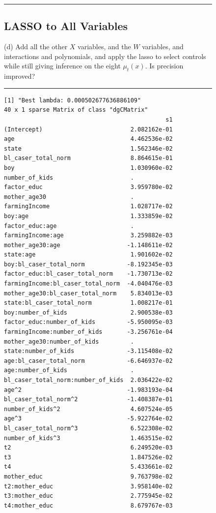 \documentclass{article}
\newenvironment{colorparagraph}[1]{\par\color{#1}}{\par}
\begin{document}
\begin{figure}[H]
\begin{colorparagraph}{questioncolor}
\label{q3d}
\rule{\textwidth}{0.5pt}
\subsection{LASSO to All Variables}
(d) Add all the other \( X \) variables, and the \( W \) variables, and interactions and polynomials, and apply the lasso to select controls while still giving inference on the eight \( \mu_t(x) \). Is precision improved?

\rule{\textwidth}{0.5pt}
\end{colorparagraph}
\end{figure}

\begin{figure}[H]
\begin{lstlisting}[style=RstyleComment, caption=LASSO for CATE]
[1] "Best lambda: 0.000502677636886109"
40 x 1 sparse Matrix of class "dgCMatrix"
                                              s1
(Intercept)                         2.082162e-01
age                                 4.462536e-02
state                               1.562346e-02
bl_caser_total_norm                 8.864615e-01
boy                                 1.030960e-02
number_of_kids                      .           
factor_educ                         3.959780e-02
mother_age30                        .           
farmingIncome                       1.028717e-02
boy:age                             1.333859e-02
factor_educ:age                     .           
farmingIncome:age                   3.259882e-03
mother_age30:age                   -1.148611e-02
state:age                           1.901602e-02
boy:bl_caser_total_norm            -8.192345e-03
factor_educ:bl_caser_total_norm    -1.730713e-02
farmingIncome:bl_caser_total_norm  -4.040476e-03
mother_age30:bl_caser_total_norm    5.834013e-03
state:bl_caser_total_norm           1.008217e-01
boy:number_of_kids                  2.900538e-03
factor_educ:number_of_kids         -5.950095e-03
farmingIncome:number_of_kids       -3.256761e-04
mother_age30:number_of_kids         .           
state:number_of_kids               -3.115408e-02
age:bl_caser_total_norm            -6.646937e-02
age:number_of_kids                  .           
bl_caser_total_norm:number_of_kids  2.036422e-02
age^2                              -1.983193e-04
bl_caser_total_norm^2              -1.408387e-01
number_of_kids^2                    4.607524e-05
age^3                              -5.922764e-02
bl_caser_total_norm^3               6.522308e-02
number_of_kids^3                    1.463515e-02
t2                                  6.249520e-03
t3                                  1.847526e-02
t4                                  5.433661e-02
mother_educ                         9.763798e-02
t2:mother_educ                      3.958140e-02
t3:mother_educ                      2.775945e-02
t4:mother_educ                      8.679767e-03
\end{lstlisting}
\end{figure}
\end{document}
